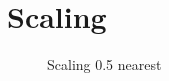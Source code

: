 \pagebreak

\section{Scaling}

\begin{figure}[!htb]\centering
    \begin{minipage}{0.6\textwidth}
        \caption{\small{Scaling 0.5 nearest}}
    \end{minipage}
\end{figure}

